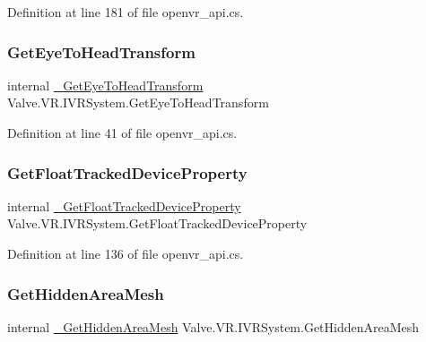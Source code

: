 Definition at line 181 of file openvr\+\_\+api.\+cs.

\mbox{\label{struct_valve_1_1_v_r_1_1_i_v_r_system_a6cf8f7e1b8b9187bf3d4ded098d49203}} 
\subsubsection{\texorpdfstring{GetEyeToHeadTransform}{GetEyeToHeadTransform}}
{\footnotesize\ttfamily internal \mbox{\hyperlink{struct_valve_1_1_v_r_1_1_i_v_r_system_a285d2953403229712d9fa48bb3224d80}{\+\_\+\+Get\+Eye\+To\+Head\+Transform}} Valve.\+V\+R.\+I\+V\+R\+System.\+Get\+Eye\+To\+Head\+Transform}



Definition at line 41 of file openvr\+\_\+api.\+cs.

\mbox{\label{struct_valve_1_1_v_r_1_1_i_v_r_system_aae99b75e4e0541e865cb73d1b3a01b8e}} 
\subsubsection{\texorpdfstring{GetFloatTrackedDeviceProperty}{GetFloatTrackedDeviceProperty}}
{\footnotesize\ttfamily internal \mbox{\hyperlink{struct_valve_1_1_v_r_1_1_i_v_r_system_a463f30e32dfce512ceed667f548e83ed}{\+\_\+\+Get\+Float\+Tracked\+Device\+Property}} Valve.\+V\+R.\+I\+V\+R\+System.\+Get\+Float\+Tracked\+Device\+Property}



Definition at line 136 of file openvr\+\_\+api.\+cs.

\mbox{\label{struct_valve_1_1_v_r_1_1_i_v_r_system_ad69e1074728820f7385004d571f2687a}} 
\subsubsection{\texorpdfstring{GetHiddenAreaMesh}{GetHiddenAreaMesh}}
{\footnotesize\ttfamily internal \mbox{\hyperlink{struct_valve_1_1_v_r_1_1_i_v_r_system_a2778354bdfffa5063ed74f2634feb02d}{\+\_\+\+Get\+Hidden\+Area\+Mesh}} Valve.\+V\+R.\+I\+V\+R\+System.\+Get\+Hidden\+Area\+Mesh}



